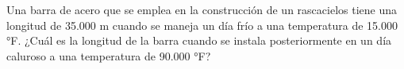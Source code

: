 \item Una barra de acero que se emplea en la construcción de un rascacielos tiene una longitud de 35.000 m cuando se maneja un día frío a una temperatura de 15.000 °F. ¿Cuál es la longitud de la barra cuando se instala posteriormente en un día caluroso a una temperatura de 90.000 °F?
